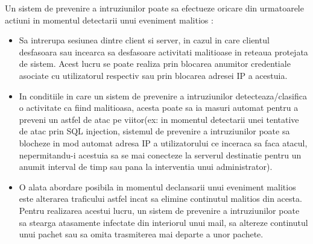 Un sistem de prevenire a intruziunilor poate sa efectueze oricare din urmatoarele actiuni in momentul detectarii unui eveniment malitios \cite{ips_fire}:
\begin{itemize}
	\item Sa intrerupa sesiunea dintre client si server, in cazul in care clientul desfasoara sau incearca sa desfasoare activitati malitioase in reteaua protejata de sistem. Acest lucru se poate realiza prin blocarea anumitor credentiale asociate cu utilizatorul respectiv sau prin blocarea adresei IP a acestuia.
	\item In conditiile in care un sistem de prevenire a intruziunilor detecteaza/clasifica o activitate ca fiind malitioasa, acesta poate sa ia masuri automat pentru a preveni un astfel de atac pe viitor(ex: in momentul detectarii unei tentative de atac prin SQL injection, sistemul de prevenire a intruziunilor poate sa blocheze in mod automat adresa IP a utilizatorului ce inceraca sa faca atacul, nepermitandu-i acestuia sa se mai conecteze la serverul destinatie pentru un anumit interval de timp sau pana la interventia unui administrator).
	\item O alata abordare posibila in momentul declansarii unui eveniment malitios este alterarea traficului astfel incat sa elimine continutul malitios din acesta. Pentru realizarea acestui lucru, un sistem de prevenire a intruziunilor poate sa stearga atasamente infectate din interiorul unui mail, sa altereze continutul unui pachet sau sa omita trasmiterea mai departe a unor pachete.
	
\end{itemize}

